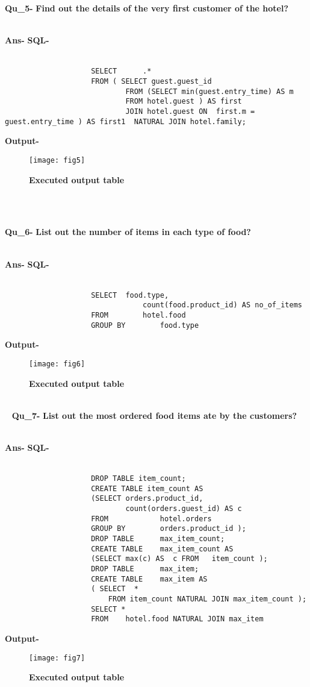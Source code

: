 \documentclass[a4,12pt]{report}
\begin{document}
\textbf{Qu\_5-}  \textbf{Find out the details of the very first customer of the hotel?} \\\

\textbf{Ans-}		\textbf{SQL-} \\\
\begin{lstlisting}
					SELECT		.*
					FROM ( SELECT guest.guest_id
							FROM (SELECT min(guest.entry_time) AS m
							FROM hotel.guest ) AS first
							JOIN hotel.guest ON  first.m = guest.entry_time ) AS first1  NATURAL JOIN hotel.family;
\end{lstlisting}

\textbf{Output-} \\			   
\begin{figure}[hbtp]
\centering
\texttt{[image: fig5]}
\caption{\textbf{{\color{red}Executed output table}}}
\end{figure}
\\\

\textbf{Qu\_6-}  \textbf{List out the number of items in each type of food?} \\\

\textbf{Ans-}		\textbf{SQL-} \\\
\begin{lstlisting}
					SELECT	food.type,
								count(food.product_id) AS no_of_items 
					FROM  		hotel.food
					GROUP BY		food.type
\end{lstlisting}
\textbf{Output-} \\			   
\begin{figure}[hbtp]
\centering
\texttt{[image: fig6]}
\caption{\textbf{{\color{red}Executed output table}}}
\end{figure}
\\\
\newpage
\textbf{Qu\_7-}  \textbf{List out the most ordered food items ate by the customers?} \\\

\textbf{Ans-}		\textbf{SQL-} \\\
\begin{lstlisting}
					DROP TABLE item_count;
					CREATE TABLE item_count AS 
					(SELECT	orders.product_id,
							count(orders.guest_id) AS c
					FROM			hotel.orders
					GROUP BY		orders.product_id );
					DROP TABLE  	max_item_count;
					CREATE TABLE  	max_item_count AS 
					(SELECT	max(c) AS  c FROM	item_count );
					DROP TABLE 		max_item;
					CREATE TABLE  	max_item AS
					( SELECT  *
						FROM item_count NATURAL JOIN max_item_count );
					SELECT *
					FROM	hotel.food NATURAL JOIN	max_item
\end{lstlisting}
\textbf{Output-} \\			   
\begin{figure}[hbtp]
\centering
\texttt{[image: fig7]}
\caption{\textbf{{\color{red}Executed output table}}}
\end{figure}
\\\
\end{document}
